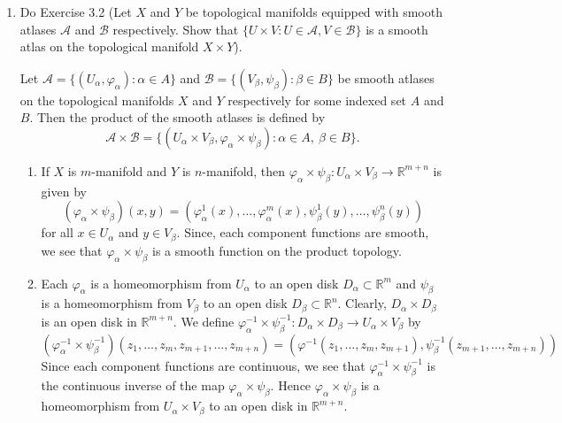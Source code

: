 \documentclass[12pt]{article}
\newcommand{\rl}{\mathbb{R}}
\begin{document}
\begin{enumerate}
\begin{mybox}
\end{mybox}
 
 
\item Do Exercise 3.2 (Let $X$ and $Y$ be
topological manifolds equipped with smooth
atlases $\mathcal{A}$ and $\mathcal{B}$
respectively.
Show that $\{U\times V: U\in \mathcal{A},
V\in\mathcal{B}\}$ is a smooth
atlas on the topological manifold
$X\times Y$).

\begin{mybox}

    Let $\mathcal{A}=\{(U_\alpha,\varphi_\alpha):
    \alpha\in A\}$ and 
    $\mathcal{B}=\{(V_\beta,\psi_\beta):
    \beta\in B\}$ be smooth atlases on the
    topological
    manifolds $X$ and $Y$ respectively
    for some indexed set
    $A$ and $B$. Then the product of the smooth
    atlases is defined by
    $$\mathcal{A\times B}=\{(U_\alpha\times
    V_\beta,\varphi_\alpha\times \psi_\beta):
    \alpha\in A, \ \beta\in B\}.$$
    
    \begin{enumerate}
        \item If $X$ is $m$-manifold and $Y$ is $n$-manifold,
        then $\varphi_\alpha\times \psi_\beta:
        U_\alpha\times V_\beta\to \rl^{m+n}$ is
        given by $$(\varphi_\alpha\times \psi_\beta)
        (x,y)=(\varphi_\alpha^1(x),\ldots,
        \varphi_\alpha^m(x),
        \psi_\beta^1(y),\ldots,\psi_\beta^n(y))$$
        for all $x\in U_\alpha$ and $y\in V_\beta$.
        Since, each component functions are smooth,
        we see that $\varphi_\alpha\times \psi_\beta$
        is a smooth function on the product
        topology.

        \vspace*{3mm}
        \item Each $\varphi_\alpha$ is a
        homeomorphism from $U_\alpha$ to an open
        disk $D_\alpha\subset\rl^m$ and 
        $\psi_\beta$ is a
        homeomorphism from $V_\beta$ to an open
        disk $D_\beta\subset\rl^n$. Clearly,
        $D_\alpha\times D_\beta$ is an open
        disk in $\rl^{m+n}$. We define
        $\varphi_\alpha^{-1}\times \psi_\beta
        ^{-1}:D_\alpha\times D_\beta\to
        U_\alpha\times V_\beta$ by
        $$(\varphi_\alpha^{-1}\times \psi_\beta
        ^{-1})(z_1,\ldots,z_m,z_{m+1},\ldots,z_{m+n})
        =(\varphi^{-1}(z_1,\ldots,z_m,z_{m+1}),
        \psi_\beta^{-1}(z_{m+1},\ldots,z_{m+n}))$$
        Since each component functions are
        continuous, we see that
        $\varphi_\alpha^{-1}\times \psi_\beta
        ^{-1}$ is the continuous inverse of the
        map $\varphi_\alpha\times \psi_\beta$.
        Hence $\varphi_\alpha\times \psi_\beta$
        is a homeomorphism from
        $U_\alpha\times V_\beta$ to an open
        disk in $\rl^{m+n}$.


\end{enumerate}
\end{mybox}
\end{enumerate}
\end{document}
